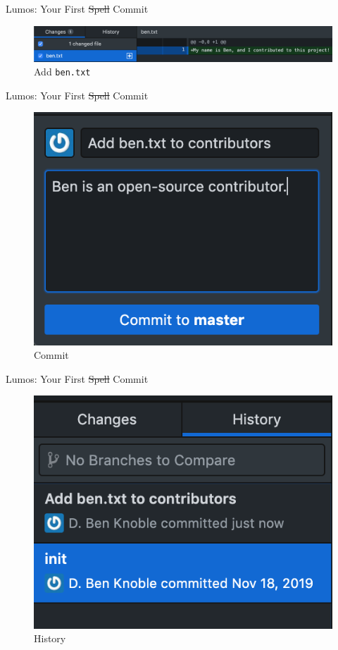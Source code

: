 \documentclass{beamer}
\theoremstyle{example}
\begin{document}
\begin{frame}{Lumos: Your First \sout{Spell} Commit}
    \begin{figure}
        \includegraphics[scale=0.4]{img/add_ben}
        \caption{Add \texttt{ben.txt}}
    \end{figure}
\end{frame}

\begin{frame}{Lumos: Your First \sout{Spell} Commit}
    \begin{figure}
        \includegraphics[scale=0.4]{img/commit_ben}
        \caption{Commit}
    \end{figure}
\end{frame}

\begin{frame}{Lumos: Your First \sout{Spell} Commit}
    \begin{figure}
        \includegraphics[scale=0.4]{img/history_ben}
        \caption{History}
    \end{figure}
\end{frame}
\end{document}
